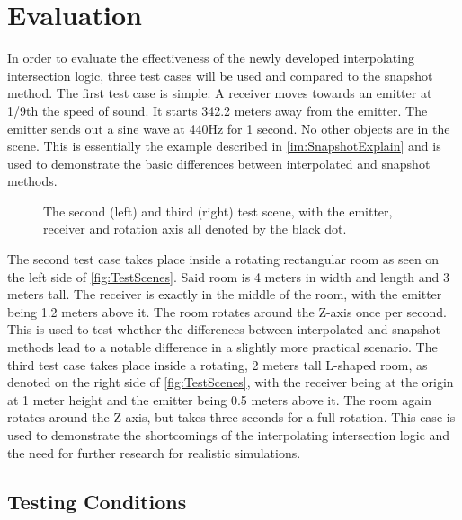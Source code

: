 \chapter{Evaluation}\label{ch:Evaluation}

In order to evaluate the effectiveness of the newly developed interpolating intersection logic,
three test cases will be used and compared to the snapshot method.
\newline
The first test case is simple: A receiver moves towards an emitter at 1/9th the speed of sound.
It starts 342.2 meters away from the emitter.
The emitter sends out a sine wave at 440Hz for 1 second.
No other objects are in the scene.
\newline
This is essentially the example described in \ref{im:SnapshotExplain}
and is used to demonstrate the basic differences between interpolated and snapshot methods.
\newline
\begin{figure}[t!]
    
    \caption{The second (left) and third (right) test scene, with the emitter, receiver and rotation axis all denoted by the black dot.}\label{fig:TestScenes}
\end{figure}
The second test case takes place inside a rotating rectangular room as seen on the left side of \autoref{fig:TestScenes}.
Said room is 4 meters in width and length and 3 meters tall.
The receiver is exactly in the middle of the room,
with the emitter being 1.2 meters above it.
The room rotates around the Z-axis once per second.
\newline
This is used to test whether the differences between interpolated and snapshot methods
lead to a notable difference in a slightly more practical scenario.
\newline
The third test case takes place inside a rotating, 2 meters tall L-shaped room,
as denoted on the right side of \autoref{fig:TestScenes},
with the receiver being at the origin at 1 meter height and the emitter being 0.5 meters above it.
The room again rotates around the Z-axis, but takes three seconds for a full rotation.
\newline
This case is used to demonstrate the shortcomings of the interpolating intersection logic
and the need for further research for realistic simulations.

\section{Testing Conditions}

